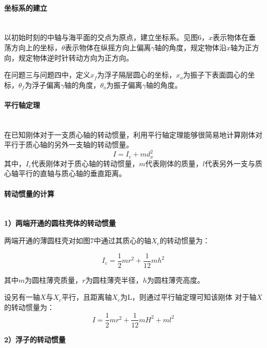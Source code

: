 \documentclass{my_paper}
\newcommand{\subsubsubsection}[1]{\paragraph{#1}\mbox{}\\}
\begin{document}
\subsubsubsection{坐标系的建立}

以初始时刻的中轴与海平面的交点为原点，建立坐标系。见图6，$x$表示物体在垂荡方向上的坐标，$\theta$表示物体在纵摇方向上偏离$\gamma$轴的角度，规定物体沿$x$轴为正方向，规定物体逆时针转动方向为正方向。

在问题三与问题四中，定义$x_{f}$为浮子隔层圆心的坐标，$x_{o}$为振子下表面圆心的坐标，$\theta_{f}$为浮子偏离$\gamma$轴的角度，$\theta_{o}$为振子偏离$\gamma$轴的角度。

\subsubsubsection{平行轴定理}

    在已知刚体对于一支质心轴的转动惯量，利用平行轴定理能够很简易地计算刚体对平行于质心轴的另外一支轴的转动惯量。
    $$
    I=I_{c}+m d_{x}^{2}
    $$
    其中，$I_{c}$代表刚体对于质心轴的转动惯量，$m$代表刚体的质量，$l$代表另外一支与质心轴平行的直轴与质心轴的垂直距离。

\subsubsubsection{转动惯量的计算}


\textbf{1）两端开通的圆柱壳体的转动惯量}


两端开通的薄圆柱壳对如图7中通过其质心的轴$X_c$的转动惯量为：

\begin{equation}
    I_c=\frac{1}{2}m r^{2}+\frac{1}{12}m h^{2}
\end{equation}

其中$m$为圆柱薄壳质量，$r$为圆柱薄壳半径，$h$为圆柱薄壳高度。

设另有一轴$X$与$X_c$平行，且距离轴$X_c$为L，则通过平行轴定理可知该刚体
对于轴$X$的转动惯量为：
\begin{equation}
    I=\frac{1}{2}m r^{2}+\frac{1}{12}m H^2+m l^2 \label{yuanzhuqiao}
\end{equation}

\textbf{2）浮子的转动惯量}
\end{document}
